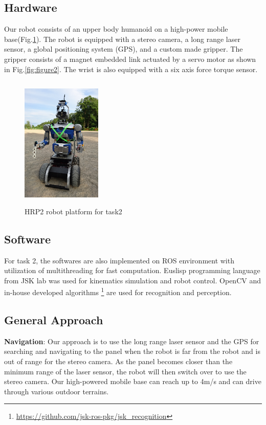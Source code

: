 \documentclass{standalone}
\begin{document}
\subsection{Hardware}
Our robot consists of an upper body humanoid on a high-power mobile base(Fig.\ref{fig:figure1}). The robot is equipped with a stereo camera, a long range laser sensor, a global positioning system (GPS), and a custom made gripper. The gripper consists of a magnet embedded link actuated by a servo motor as shown in Fig.\ref{fig:figure2}. The wrist is also equipped with a six axis force torque sensor. 


\begin{figure}
  \includegraphics[height=2.5in, width=1.5in]{sections/task2/images/figure1}
  \caption{HRP2 robot platform for task2}
  \label{fig:figure1}
\end{figure}

\subsection{Software}

For task 2, the softwares are also implemented on ROS environment with utilization of multithreading for fast computation. Euslisp programming language from JSK lab was used for kinematics simulation and robot control. OpenCV and in-house developed algorithms
 \footnote{\url{https://github.com/jsk-ros-pkg/jsk_recognition}} are used for recognition and perception.


 \subsection{General Approach}
 \textbf{Navigation}: Our approach is to use the long range laser sensor and the GPS for searching and navigating to the panel when the robot is far from the robot and is out of range for the stereo camera. As the panel becomes closer than the minimum range of the laser sensor, the robot will then switch over to use the stereo camera. Our high-powered mobile base can reach up to 4m/s and can drive through various outdoor terrains. 
\end{document}
